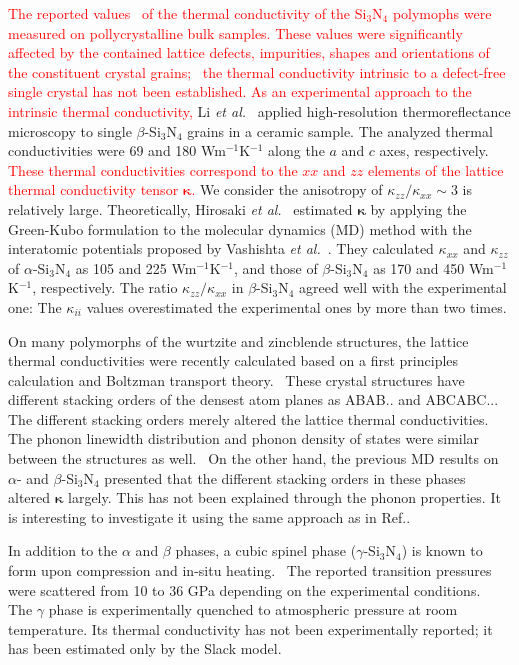 \documentclass[twocolumn,amsmath,amssymb,a4paper,prb,superscriptaddress,floatfix]{revtex4-1}
\begin{document}
\textcolor{red}{The reported values~\cite{zhou,hirao-rev,watari,hirosaki,hirai}
of the thermal conductivity of the Si$_3$N$_4$ polymophs were measured on
pollycrystalline bulk samples. These values were significantly affected by
the contained lattice defects, impurities, shapes and orientations of the
constituent crystal grains;~\cite{hirosaki-md} the thermal conductivity intrinsic to a
defect-free single crystal has not been established. As
an experimental approach to the intrinsic thermal conductivity,} Li {\it et
al.}~\cite{li} applied high-resolution thermoreflectance microscopy to single
$\beta$-Si$_3$N$_4$ grains in a ceramic sample. The analyzed thermal
conductivities were 69 and 180 Wm$^{-1}$K$^{-1}$ along the $a$ and $c$ axes,
respectively. \textcolor{red}{These thermal conductivities correspond to the
$xx$ and $zz$  elements of the lattice thermal conductivity tensor
$\boldsymbol{\kappa}$.} We consider the anisotropy of
$\kappa_{zz}/\kappa_{xx}\sim 3$ is relatively large.  Theoretically, Hirosaki
{\it et al.}~\cite{hirosaki-md} estimated $\boldsymbol{\kappa}$ by
applying the Green-Kubo formulation to the molecular dynamics (MD) method with
the interatomic potentials proposed by Vashishta {\it et al.}~\cite{vashishta}. 
They calculated $\kappa$$_{xx}$ and $\kappa$$_{zz}$ of
$\alpha$-Si$_3$N$_4$ as 105 and 225 Wm$^{-1}$K$^{-1}$, and those of
$\beta$-Si$_3$N$_4$ as 170 and 450 Wm$^{-1}$K$^{-1}$, respectively.
The ratio $\kappa_{zz}/\kappa_{xx}$ in $\beta$-Si$_3$N$_4$ agreed well with the
experimental one: The $\kappa_{ii}$
values overestimated the experimental ones by more than two times. 

On many polymorphs of the wurtzite and zincblende structures, the lattice
thermal conductivities were recently calculated based on a first principles
calculation and Boltzman transport theory.~\cite{phono3py}  These crystal
structures
have different stacking orders of the densest atom planes as ABAB.. and
ABCABC...  The different stacking orders merely altered the lattice thermal
conductivities.~\cite{phono3py} The phonon linewidth distribution and phonon
density of states were similar between the structures as well.~\cite{phono3py}
On the other hand, the previous MD results on $\alpha$- and
$\beta$-Si$_3$N$_4$ presented that the different stacking orders in these
phases altered $\boldsymbol{\kappa}$ largely. This
has not been explained through the phonon properties.
It is interesting to investigate it using the same approach as in
Ref..

In addition to the $\alpha$ and $\beta$ phases, a cubic spinel phase
($\gamma$-Si$_3$N$_4$) is known to form upon compression and in-situ
heating.~\cite{zerr,zhang} The reported transition pressures were scattered
from 10 to 36 GPa depending on the experimental conditions.~\cite{xu}  The
$\gamma$ phase is experimentally quenched to atmospheric pressure at room
temperature.  Its thermal conductivity has not been experimentally reported; it
has been estimated only by the Slack model.~\cite{morelli} 
\end{document}
